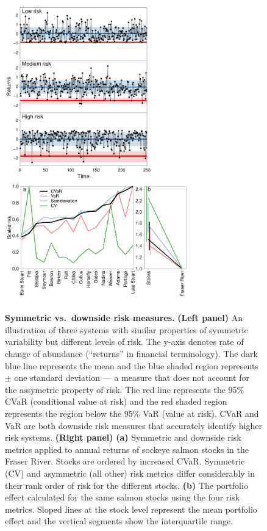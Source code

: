 \begin{figure}[htbp]
\centering
\includegraphics[height=3.0in]{skewness-abundance.pdf}
\includegraphics[height=2.0in]{compare-risk-and-portfolio-scale.pdf} \caption{
  \textbf{Symmetric vs.\ downside risk measures.} \textbf{(Left panel)} An
  illustration of three systems with similar properties of symmetric
  variability but different levels of risk. The y-axis denotes rate of change
  of abundance (``returns'' in financial terminology). The
  dark blue line represents the mean and the blue shaded region represents
  $\pm$ one standard deviation --- a measure that does not account for the
  assymetric property of risk. The red line represents the 95\% CVaR
  (conditional value at risk) and the red shaded region represents the region
  below the 95\% VaR (value at risk). CVaR and VaR are both downside risk
  measures that accurately identify higher risk systems. \textbf{(Right panel)}
  \textbf{(a)} Symmetric and downside risk metrics applied to annual returns of
  sockeye salmon stocks in the Fraser River. Stocks are ordered by increased
  CVaR. Symmetric (CV) and asymmetric (all other) risk metrics differ
  considerably in their rank order of risk for the different stocks.
  \textbf{(b)} The portfolio effect calculated for the same salmon stocks using
  the four risk metrics. Sloped lines at the stock level represent the mean
  portfolio effect and the vertical segments show the interquartile range.}
\label{fig:risk}
\end{figure}
